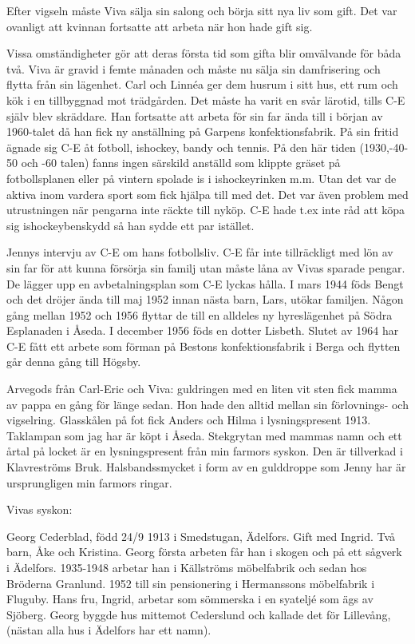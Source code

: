 Efter vigseln måste Viva sälja sin salong och börja sitt nya liv som gift. Det var ovanligt att kvinnan fortsatte att arbeta när hon hade gift sig.


Vissa omständigheter gör att deras första tid som gifta blir omvälvande för båda två. Viva är gravid i femte månaden och måste nu sälja sin damfrisering och flytta från sin lägenhet. Carl och Linnéa ger dem husrum i sitt hus, ett rum och kök i en tillbyggnad mot trädgården.
 Det måste ha varit en svår lärotid, tills C-E själv blev skräddare. Han fortsatte att arbeta för sin far ända till i början av 1960-talet då han fick ny anställning på Garpens konfektionsfabrik. På sin fritid ägnade sig C-E åt fotboll, ishockey, bandy och tennis. På den här tiden (1930,-40-50 och -60 talen) fanns ingen särskild anställd som klippte gräset på fotbollsplanen eller på vintern spolade is i ishockeyrinken m.m. Utan det var de aktiva inom vardera sport som fick hjälpa till med det. Det var även problem med utrustningen när pengarna inte räckte till nyköp. C-E hade t.ex inte råd att köpa sig ishockeybenskydd så han sydde ett par istället.


Jennys intervju av C-E om hans fotbollsliv.
 C-E får inte tillräckligt med lön av sin far för att kunna försörja sin familj utan måste låna av Vivas sparade pengar. De lägger upp en avbetalningsplan som C-E lyckas hålla. I mars 1944 föds Bengt och det dröjer ända till maj 1952 innan nästa barn, Lars, utökar familjen. Någon gång mellan 1952 och 1956 flyttar de till en alldeles ny hyreslägenhet på Södra Esplanaden i Åseda. I december 1956 föds en dotter Lisbeth.
Slutet av 1964 har C-E fått ett arbete som förman på Bestons konfektionsfabrik i Berga och flytten går denna gång till Högsby.


Arvegods från Carl-Eric och Viva: guldringen med en liten vit sten fick mamma av pappa en gång för länge sedan. Hon hade den alltid mellan sin förlovnings- och vigselring. Glasskålen på fot fick Anders och Hilma i lysningspresent 1913. Taklampan som jag har är köpt i Åseda.
Stekgrytan med mammas namn och ett årtal på locket är en lysningspresent från min farmors syskon. Den är tillverkad i Klavreströms Bruk.
Halsbandssmycket i form av en gulddroppe som Jenny har är ursprungligen min farmors ringar.




Vivas syskon:


Georg Cederblad, född 24/9 1913 i Smedstugan, Ädelfors. Gift med Ingrid. Två barn, Åke och Kristina.
Georg första arbeten får han i skogen och på ett sågverk i Ädelfors. 1935-1948 arbetar han i Källströms möbelfabrik och sedan hos Bröderna Granlund. 1952 till sin pensionering i Hermanssons möbelfabrik i Fluguby.
Hans fru, Ingrid, arbetar som sömmerska i en syateljé som ägs av Sjöberg.
Georg byggde hus mittemot Cederslund och kallade det för Lillevång, (nästan alla hus i Ädelfors har ett namn).


